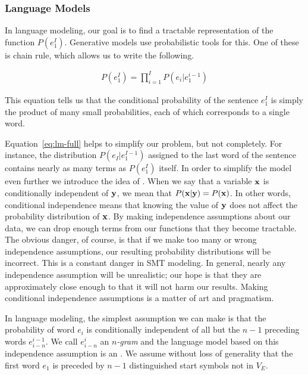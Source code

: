 \subsubsection{Language Models}\label{sec:language-models}

In language modeling, our goal is to find a tractable
representation of the function $P(e_1^I)$.
Generative models use probabilistic tools for
this.  One of these is chain rule, which allows us
to write the following.

\begin{align}
P(e_1^I) = \prod_{i=1}^I P(e_i|e_1^{i-1})\label{eq:lm-full}
\end{align} 

\noindent This equation tells us that the conditional probability
of the sentence $e_1^I$ is
simply the product of many small probabilities, each
of which corresponds to a single word.

Equation~\ref{eq:lm-full} helps to simplify our
problem, but not completely.  For instance, the distribution
$P(e_I|e_1^{I-1})$ assigned to the last word of the sentence
contains nearly as many terms as $P(e_1^I)$ itself.
In order to simplify the model even further
we introduce the idea of .  When we say that a variable ${\bf x}$ is
conditionally independent of ${\bf y}$, we mean that
$P({\bf x}|{\bf y}) = P({\bf x})$.  In other words, conditional
independence means that knowing the value of ${\bf y}$ 
does not affect the probability distribution 
of ${\bf x}$.  By making independence assumptions
about our data, we can drop enough 
terms from our functions that they become 
tractable.  The obvious danger, of course, is that 
if we make too many or wrong independence assumptions,
our resulting probability distributions will be incorrect.
This is a constant danger in SMT modeling.  In general,
nearly any independence assumption will be unrealistic; 
our hope is that they are approximately close enough
to that it will not harm our results.  
Making conditional independence assumptions 
is a matter of art and pragmatism.

In language modeling, the simplest assumption we
can make is that the probability of word $e_i$ is
conditionally independent of all but the $n-1$ preceding
words $e_{i-n}^{i-1}$.  We call $e_{i-n}^i$ an {\em $n$-gram}
and the language model based on this independence assumption is an .  We assume without loss of generality that
the first word $e_1$ is preceded by $n-1$ distinguished
start symbols not in $V_E$.

